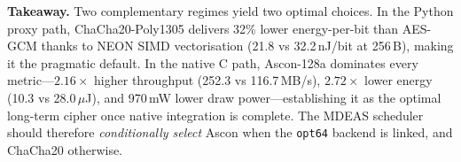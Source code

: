 \smallskip\noindent\textbf{Takeaway.}\enspace
Two complementary regimes yield two optimal choices.
In the Python proxy path, ChaCha20-Poly1305 delivers 32\% lower
energy-per-bit than AES-GCM thanks to NEON SIMD vectorisation
(21.8 vs 32.2\,nJ/bit at 256\,B), making it the pragmatic default.
In the native C path, Ascon-128a dominates every metric---$2.16\times$
higher throughput (252.3 vs 116.7\,MB/s), $2.72\times$ lower energy
(10.3 vs 28.0\,$\mu$J), and 970\,mW lower draw power---establishing
it as the optimal long-term cipher once native integration is
complete.
The MDEAS scheduler should therefore \emph{conditionally select}
Ascon when the \texttt{opt64} backend is linked, and ChaCha20
otherwise.
